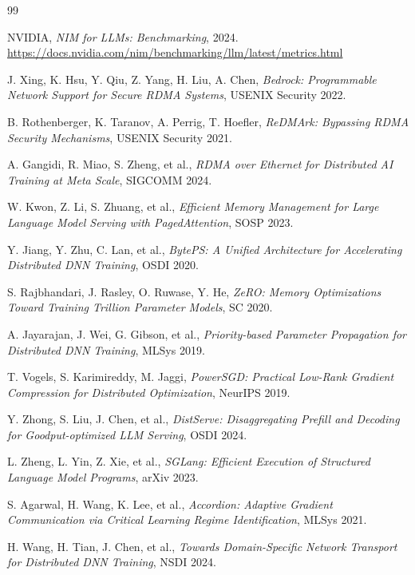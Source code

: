 \documentclass[10pt,letterpaper]{article}
\begin{document}
\vspace{-2pt}

\begin{thebibliography}{99}

NVIDIA, \textit{NIM for LLMs: Benchmarking}, 2024.
\url{https://docs.nvidia.com/nim/benchmarking/llm/latest/metrics.html}

J. Xing, K. Hsu, Y. Qiu, Z. Yang, H. Liu, A. Chen,
\textit{Bedrock: Programmable Network Support for Secure RDMA Systems}, USENIX Security 2022.

B. Rothenberger, K. Taranov, A. Perrig, T. Hoefler,
\textit{ReDMArk: Bypassing RDMA Security Mechanisms}, USENIX Security 2021.

A. Gangidi, R. Miao, S. Zheng, et al.,
\textit{RDMA over Ethernet for Distributed AI Training at Meta Scale}, SIGCOMM 2024.

W. Kwon, Z. Li, S. Zhuang, et al.,
\textit{Efficient Memory Management for Large Language Model Serving with PagedAttention}, SOSP 2023.

Y. Jiang, Y. Zhu, C. Lan, et al.,
\textit{BytePS: A Unified Architecture for Accelerating Distributed DNN Training}, OSDI 2020.

S. Rajbhandari, J. Rasley, O. Ruwase, Y. He,
\textit{ZeRO: Memory Optimizations Toward Training Trillion Parameter Models}, SC 2020.

A. Jayarajan, J. Wei, G. Gibson, et al.,
\textit{Priority-based Parameter Propagation for Distributed DNN Training}, MLSys 2019.

T. Vogels, S. Karimireddy, M. Jaggi,
\textit{PowerSGD: Practical Low-Rank Gradient Compression for Distributed Optimization}, NeurIPS 2019.

Y. Zhong, S. Liu, J. Chen, et al.,
\textit{DistServe: Disaggregating Prefill and Decoding for Goodput-optimized LLM Serving}, OSDI 2024.

L. Zheng, L. Yin, Z. Xie, et al.,
\textit{SGLang: Efficient Execution of Structured Language Model Programs}, arXiv 2023.

S. Agarwal, H. Wang, K. Lee, et al.,
\textit{Accordion: Adaptive Gradient Communication via Critical Learning Regime Identification}, MLSys 2021.

H. Wang, H. Tian, J. Chen, et al.,
\textit{Towards Domain-Specific Network Transport for Distributed DNN Training}, NSDI 2024.


\end{thebibliography}
\end{document}
